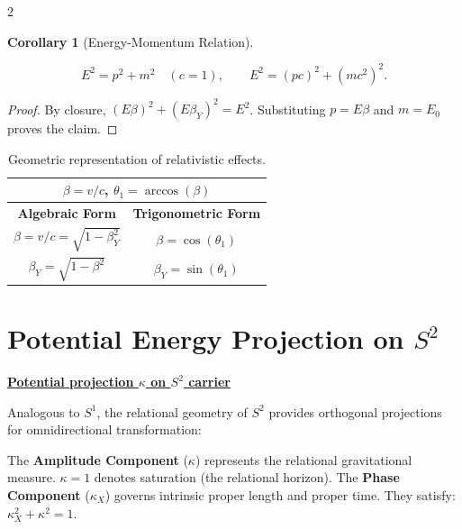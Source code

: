 \documentclass[10pt, a4paper]{article}
\newtheorem{corollary}[theorem]{Corollary}
\begin{document}
\begin{multicols}{2}
\begin{corollary}[Energy-Momentum Relation]
\hypertarget{cor:energymomentum}{}\label{cor:energymomentum}
\[
E^{2} = p^{2} + m^{2} \quad (c=1), \qquad
E^{2} = (pc)^{2} + (mc^{2})^{2}.
\]
\end{corollary}

\begin{proof}
By closure, $(E\beta)^2 + (E\beta_Y)^2 = E^2$. Substituting $p=E\beta$ and $m=E_0$ proves the claim.
\end{proof}

\begin{table}[h]
\centering\footnotesize
\begin{tabular}{|c|c|}\hline
\multicolumn{2}{|c|}{$\beta=v/c$, \quad $\theta_1= \arccos(\beta)$}\\
\hline
\textbf{Algebraic Form} & \textbf{Trigonometric Form} \\
\hline
$\beta= v/c = \sqrt{1-\beta_Y^{2}}$& $\beta = \cos(\theta_1)$\\
\hline
$\beta_Y = \sqrt{1-\beta^2}$& $\beta_Y = \sin(\theta_1)$\\\hline
\end{tabular}
\caption{Geometric representation of relativistic effects.}
\end{table}



\section{Potential Energy Projection on $S^2$}

\begin{tcolorbox}[colback=gray!5, colframe=black!80!black, title=Desmos project]
\textbf{\href{https://www.desmos.com/geometry/lsjhnc2e9x}{Potential projection $\kappa$ on $S^2$ carrier}}
\end{tcolorbox}

Analogous to $S^1$, the relational geometry of $S^2$ provides orthogonal projections for omnidirectional transformation:

The \textbf{Amplitude Component} ($\kappa$) represents the relational gravitational measure. $\kappa=1$ denotes saturation (the relational horizon). The \textbf{Phase Component} ($\kappa_X$) governs intrinsic proper length and proper time. They satisfy:
$\kappa_X^2 + \kappa^2 = 1$.


\end{multicols}
\end{document}

